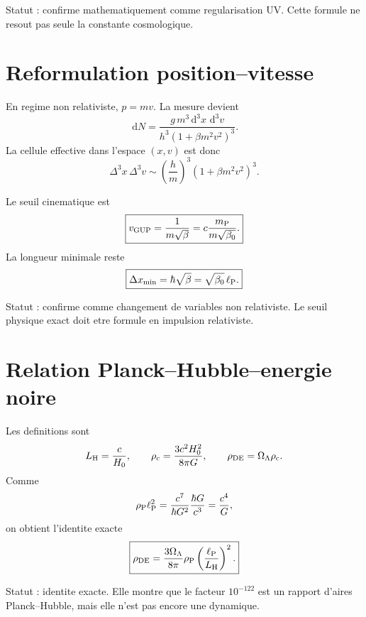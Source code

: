 \documentclass[11pt,a4paper]{article}
\newcommand{\dd}{\,\mathrm d}
\newcommand{\lp}{\ell_{\rm P}}
\newcommand{\rhoP}{\rho_{\rm P}}
\newcommand{\rhoDE}{\rho_{\rm DE}}
\newcommand{\rhoC}{\rho_{\rm c}}
\newcommand{\LH}{L_{\rm H}}
\begin{document}
Statut : confirme mathematiquement comme regularisation UV. Cette formule ne
resout pas seule la constante cosmologique.

\section{Reformulation position--vitesse}

En regime non relativiste, $p=mv$. La mesure devient
\begin{equation}
\dd N
=
\frac{g\,m^3\dd^3x\,\dd^3v}
{h^3(1+\beta m^2v^2)^3}.
\end{equation}
La cellule effective dans l'espace $(x,v)$ est donc
\begin{equation}
\boxed{
\Delta^3x\,\Delta^3v
\sim
\left(\frac{h}{m}\right)^3
(1+\beta m^2v^2)^3.
}
\end{equation}

Le seuil cinematique est
\begin{equation}
\boxed{
v_{\rm GUP}
=
\frac{1}{m\sqrt{\beta}}
=
c\frac{m_{\rm P}}{m\sqrt{\beta_0}}.
}
\label{eq:v_gup}
\end{equation}
La longueur minimale reste
\begin{equation}
\boxed{
\Delta x_{\min}=\hbar\sqrt{\beta}
=
\sqrt{\beta_0}\,\lp.
}
\end{equation}

Statut : confirme comme changement de variables non relativiste. Le seuil
physique exact doit etre formule en impulsion relativiste.

\section{Relation Planck--Hubble--energie noire}

Les definitions sont
\begin{equation}
\LH=\frac{c}{H_0},
\qquad
\rhoC=\frac{3c^2H_0^2}{8\pi G},
\qquad
\rhoDE=\Omega_\Lambda\rhoC.
\end{equation}
Comme
\begin{equation}
\rhoP\lp^2
=
\frac{c^7}{\hbar G^2}\frac{\hbar G}{c^3}
=
\frac{c^4}{G},
\end{equation}
on obtient l'identite exacte
\begin{equation}
\boxed{
\rhoDE
=
\frac{3\Omega_\Lambda}{8\pi}
\rhoP\left(\frac{\lp}{\LH}\right)^2.
}
\label{eq:rho_de_uvir}
\end{equation}

Statut : identite exacte. Elle montre que le facteur $10^{-122}$ est un
rapport d'aires Planck--Hubble, mais elle n'est pas encore une dynamique.
\end{document}
